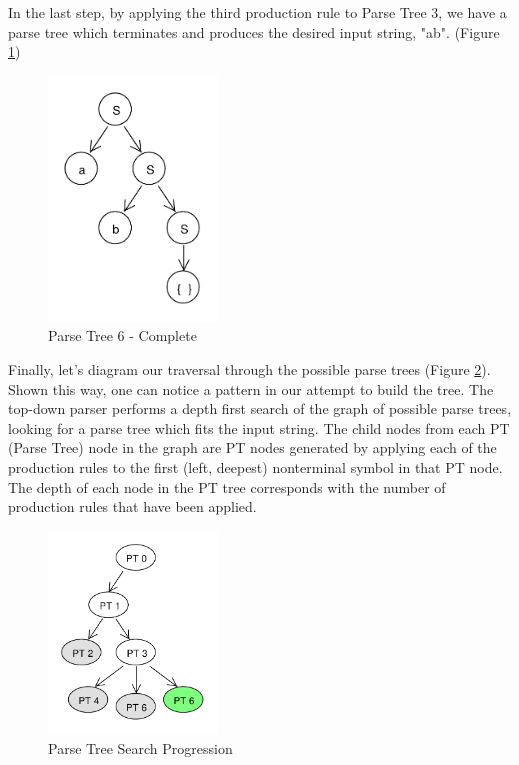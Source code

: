 \documentclass[11pt]{article}
\begin{document}
In the last step, by applying the third production rule to Parse Tree 3, we have a parse tree which terminates and produces the
desired input string, "ab". (Figure \ref{fig:rdp_6})

\begin{figure}[h!]
    \centering
    \includegraphics[width=0.4\textwidth,natwidth=30,natheight=30]{umlet/rdp_6.pdf}
    \caption{Parse Tree 6 - Complete}
    \label{fig:rdp_6}
\end{figure}

Finally, let's diagram our traversal through the possible parse trees (Figure \ref{fig:rdp_7}). Shown this way, one can notice
a pattern in our attempt to build the tree. The top-down parser performs a depth first search of the 
graph of possible parse trees, looking for a parse tree which fits the input string.
The child nodes from each PT (Parse Tree) node in the graph are PT nodes generated by
applying each of the production rules to the first (left, deepest) nonterminal symbol in that PT node.
The depth of each node in the PT tree corresponds with the number of production rules that have been applied.

\begin{figure}[h!]
    \centering
    \includegraphics[width=0.4\textwidth,natwidth=30,natheight=30]{umlet/rdp_7.pdf}
    \caption{Parse Tree Search Progression}
    \label{fig:rdp_7}
\end{figure}
\end{document}
